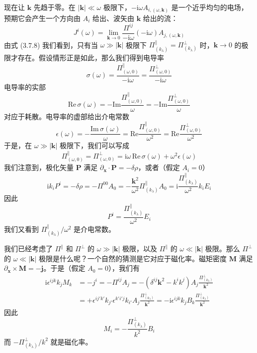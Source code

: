 现在让 $\pmb{k}$ 先趋于零。在 $|\pmb{k}|\ll\omega$ 极限下，$-\mathrm{i}\omega A_{i,(\omega,\pmb{k})}$ 是一个近乎均匀的电场，预期它会产生一个方向由 $A_i$ 给出、波矢由 $\pmb{k}$ 给出的流：
\begin{equation*}
J^i(\omega)=\lim_{\pmb{k}\to0}\frac{\Pi^{ij}}{-\mathrm{i}\omega}(-\mathrm{i}\omega)A_{j,(\omega,\pmb{k})}
\end{equation*}
由式 (3.7.8) 我们看到，只有当 $\omega\gg|\pmb{k}|$ 极限下 $\Pi^{\parallel}_{(k_\lambda)}=\Pi^{\perp}_{(k_\lambda)}$ 时，$\pmb{k}\to0$ 的极限才存在。假设情形正是如此，那么我们得到电导率
\begin{equation*}
\sigma(\omega)=\frac{\Pi^{\parallel}_{(\omega,0)}}{-\mathrm{i}\omega}=\frac{\Pi^{\perp}_{(\omega,0)}}{-\mathrm{i}\omega}
\end{equation*}
电导率的实部
\begin{equation*}
\mathrm{Re}\,\sigma(\omega)=-\mathrm{Im}\frac{\Pi^{\parallel}_{(\omega,0)}}{\omega}=-\mathrm{Im}\frac{\Pi^{\perp}_{(\omega,0)}}{\omega}
\end{equation*}
对应于耗散。电导率的虚部给出介电常数
\begin{equation*}
\epsilon(\omega)=-\frac{\mathrm{Im}\,\sigma(\omega)}{\omega}=\mathrm{Re}\frac{\Pi^{\parallel}_{(\omega,0)}}{\omega^2}=\mathrm{Re}\frac{\Pi^{\perp}_{(\omega,0)}}{\omega^2}
\end{equation*}
于是，在 $\omega\gg|\pmb{k}|$ 极限下，我们可以写成
\begin{equation*}
\Pi^{\parallel}_{(\omega,0)}=\Pi^{\perp}_{(\omega,0)}=\mathrm{i}\omega\,\mathrm{Re}\,\sigma(\omega)+\omega^2\epsilon(\omega)
\end{equation*}
我们注意到，极化矢量 $\pmb{P}$ 满足 $\partial_{\pmb{x}}\cdot\pmb{P}=-\delta\rho$，或者（假定 $A_i=0$）
\begin{equation*}
\mathrm{i}k_iP^i=-\delta\rho=-\Pi^{00}A_0=-\frac{\pmb{k}^2}{\omega^2}\Pi^{\parallel}_{(k_\lambda)}A_0=\mathrm{i}\frac{\Pi^{\parallel}_{(k_\lambda)}}{\omega^2}k_iE_i
\end{equation*}
因此
\begin{equation*}
P^i=\frac{\Pi^{\parallel}_{(k_\lambda)}}{\omega^2}E_i
\end{equation*}
我们又看到 $\Pi^{\parallel}_{(k_\lambda)}/\omega^2$ 是介电常数。

我们已经考虑了 $\Pi^{\parallel}$ 和 $\Pi^{\perp}$ 的 $\omega\gg|\pmb{k}|$ 极限，以及 $\Pi^{\parallel}$ 的 $\omega\ll|\pmb{k}|$ 极限。那么 $\Pi^{\perp}$ 的 $\omega\ll|\pmb{k}|$ 极限是什么呢？一个自然的猜测是它对应于磁化率。磁矩密度 $\pmb{M}$ 满足 $\partial_{\pmb{x}}\times\pmb{M}=-\pmb{j}$。于是（假定 $A_0=0$），我们有
\begin{align*}
\mathrm{i}\epsilon^{ijk}k_jM_k&=-j^i=-\Pi^{ij}A_j=-(\delta^{ij}\pmb{k}^2-k^ik^j)A_j\frac{\Pi^{\perp}_{(k_\lambda)}}{\pmb{k}^2}\\
&=+\epsilon^{ij'k'}k_{j'}\epsilon^{k'i'j}k_{i'}A_j\frac{\Pi^{\perp}_{(k_\lambda)}}{\pmb{k}^2}=-\mathrm{i}\epsilon^{ijk}k_jB_k\frac{\Pi^{\perp}_{(k_\lambda)}}{\pmb{k}^2}
\end{align*}
因此
\begin{equation*}
M_i=-\frac{\Pi^{\perp}_{(k_\lambda)}}{k^2}B_i
\end{equation*}
而 $-\Pi^{\perp}_{(k_\lambda)}/k^2$ 就是磁化率。

